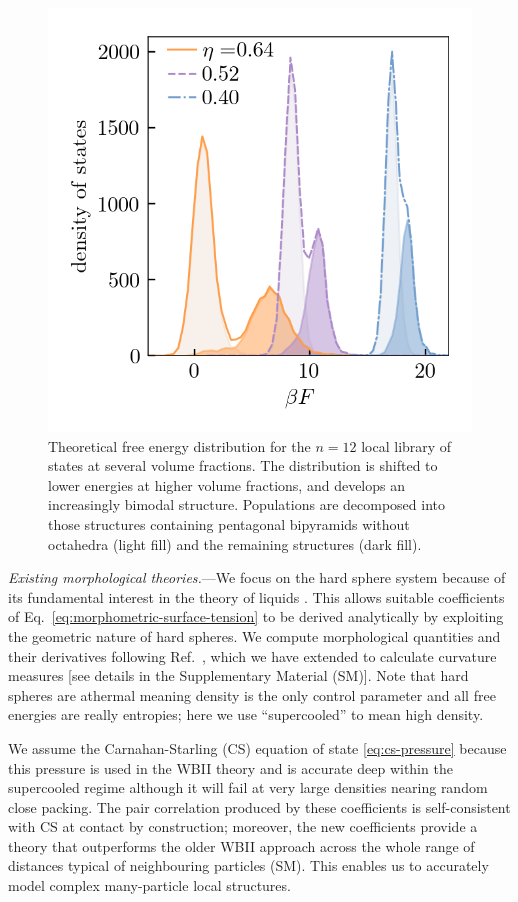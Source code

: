 \documentclass[11pt,twoside]{report}
\begin{document}
\begin{figure}
  \includegraphics[width=0.9\linewidth,outer]{n12-dos}
  \caption{
    Theoretical free energy distribution for the $n=12$ local library of states at several volume fractions.
    The distribution is shifted to lower energies at higher volume fractions, and develops an increasingly bimodal structure.
    Populations are decomposed into those structures containing pentagonal bipyramids without octahedra (light fill) and the remaining structures (dark fill).
  }
  \label{fig:n12-dos}
\end{figure}

\emph{Existing morphological theories.}---We focus on the hard sphere system because of its fundamental interest in the theory of liquids \cite{WidomS1967,Hansen2013}.
This allows suitable coefficients of Eq.\ \eqref{eq:morphometric-surface-tension} to be derived analytically by exploiting the geometric nature of hard spheres.
We compute morphological quantities and their derivatives following Ref.\ \cite{KleninJCC2011}, which we have extended to calculate curvature measures [see details in the Supplementary Material (SM)].
Note that hard spheres are athermal meaning density is the only control parameter and all free energies are really entropies; here we use ``supercooled'' to mean high density.

We assume the Carnahan-Starling (CS) equation of state \eqref{eq:cs-pressure} \cite{CarnahanJCP1969} because this pressure is used in the WBII theory and is accurate deep within the supercooled regime \cite{BerthierPRL2016} although it will fail at very large densities nearing random close packing.
The pair correlation produced by these coefficients is self-consistent with CS at contact by construction; moreover, the new coefficients provide a theory that outperforms the older WBII approach across the whole range of distances typical of neighbouring particles (SM).
This enables us to accurately model complex many-particle local structures.
\end{document}
